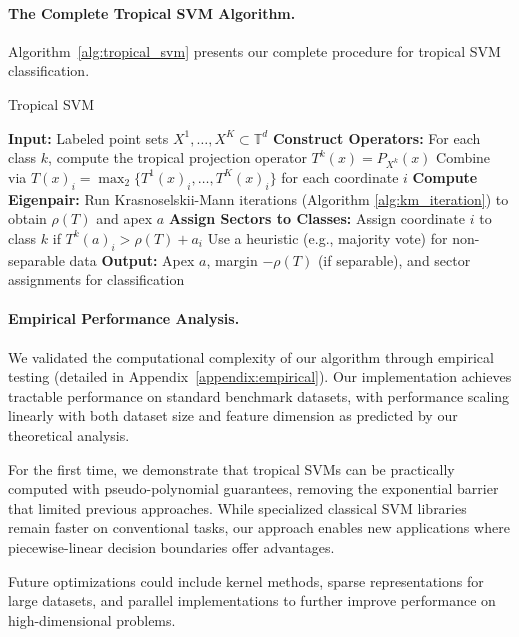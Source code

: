 \documentclass{article}
\newcommand{\trop}{\mathbb{T}}
\begin{document}
\paragraph{The Complete Tropical SVM Algorithm.}\label{subsec:complete_algorithm}
Algorithm~\ref{alg:tropical_svm} presents our complete procedure for tropical SVM classification.

\begin{algorithm}
\caption{Tropical SVM}\label{alg:tropical_svm}
\begin{algorithmic}[1]
\STATE \textbf{Input:} Labeled point sets $X^1,\dots,X^K \subset \trop^d$
\STATE \textbf{Construct Operators:}
  \STATE \quad For each class $k$, compute the tropical projection operator $T^k(x) = P_{X^k}(x)$
  \STATE \quad Combine via $T(x)_i = \operatorname{\max}_2\{T^1(x)_i, \dots, T^K(x)_i\}$ for each coordinate $i$
\STATE \textbf{Compute Eigenpair:}
  \STATE \quad Run Krasnoselskii-Mann iterations (Algorithm \ref{alg:km_iteration}) to obtain $\rho(T)$ and apex $a$
\STATE \textbf{Assign Sectors to Classes:}
    \STATE Assign coordinate $i$ to class $k$ if $T^k(a)_i > \rho(T) + a_i$
  \ELSE
    \STATE Use a heuristic (e.g., majority vote) for non-separable data
  \ENDIF
\STATE \textbf{Output:} Apex $a$, margin $-\rho(T)$ (if separable), and sector assignments for classification
\end{algorithmic}
\end{algorithm}

\paragraph{Empirical Performance Analysis.}
We validated the computational complexity of our algorithm through empirical testing (detailed in Appendix~\ref{appendix:empirical}). Our implementation achieves tractable performance on standard benchmark datasets, with performance scaling linearly with both dataset size and feature dimension as predicted by our theoretical analysis.

For the first time, we demonstrate that tropical SVMs can be practically computed with pseudo-polynomial guarantees, removing the exponential barrier that limited previous approaches. While specialized classical SVM libraries remain faster on conventional tasks, our approach enables new applications where piecewise-linear decision boundaries offer advantages.

Future optimizations could include kernel methods, sparse representations for large datasets, and parallel implementations to further improve performance on high-dimensional problems.
\end{document}
